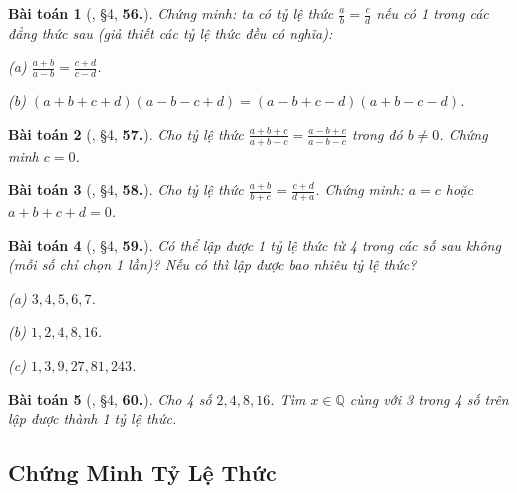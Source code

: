 \documentclass{article}
\numberwithin{equation}{section}
\newtheorem{baitoan}{Bài toán}
\begin{document}
\begin{baitoan}[\cite{Binh_Toan_7_tap_1}, \S4, \textbf{56.}]
	Chứng minh: ta có tỷ lệ thức $\frac{a}{b} = \frac{c}{d}$ nếu có 1 trong các đẳng thức sau (giả thiết các tỷ lệ thức đều có nghĩa):
	\begin{enumerate*}
		\item[(a)] $\frac{a + b}{a - b} = \frac{c + d}{c - d}$.
		\item[(b)] $(a + b + c + d)(a - b - c + d) = (a - b + c - d)(a + b - c - d)$.
	\end{enumerate*}
\end{baitoan}

\begin{baitoan}[\cite{Binh_Toan_7_tap_1}, \S4, \textbf{57.}]
	Cho tỷ lệ thức $\frac{a + b + c}{a + b - c} = \frac{a - b + c}{a - b - c}$ trong đó $b\ne 0$. Chứng minh $c = 0$.
\end{baitoan}

\begin{baitoan}[\cite{Binh_Toan_7_tap_1}, \S4, \textbf{58.}]
	Cho tỷ lệ thức $\frac{a + b}{b + c} = \frac{c + d}{d + a}$. Chứng minh: $a = c$ hoặc $a + b + c + d = 0$.
\end{baitoan}

\begin{baitoan}[\cite{Binh_Toan_7_tap_1}, \S4, \textbf{59.}]
	Có thể lập được 1 tỷ lệ thức từ 4 trong các số sau không (mỗi số chỉ chọn 1 lần)? Nếu có thì lập được bao nhiêu tỷ lệ thức?
	\begin{enumerate*}
		\item[(a)] $3,4,5,6,7$.
		\item[(b)] $1,2,4,8,16$.
		\item[(c)] $1,3,9,27,81,243$.
	\end{enumerate*}
\end{baitoan}

\begin{baitoan}[\cite{Binh_Toan_7_tap_1}, \S4, \textbf{60.}]
	Cho 4 số $2,4,8,16$. Tìm $x\in\mathbb{Q}$ cùng với 3 trong 4 số trên lập được thành 1 tỷ lệ thức.
\end{baitoan}


\subsection{Chứng Minh Tỷ Lệ Thức}

\end{document}

